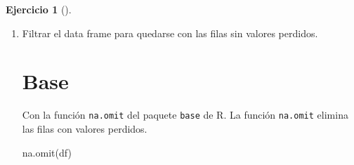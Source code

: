 \documentclass[
  spanish,
  a4paper,
]{scrreport}
\newenvironment{Shaded}{\begin{snugshade}}{\end{snugshade}}
\newcommand{\DecValTok}[1]{\textcolor[rgb]{0.68,0.00,0.00}{#1}}
\newcommand{\FunctionTok}[1]{\textcolor[rgb]{0.28,0.35,0.67}{#1}}
\newcommand{\NormalTok}[1]{\textcolor[rgb]{0.00,0.23,0.31}{#1}}
\newcommand{\SpecialCharTok}[1]{\textcolor[rgb]{0.37,0.37,0.37}{#1}}
\newcommand{\StringTok}[1]{\textcolor[rgb]{0.13,0.47,0.30}{#1}}
\theoremstyle{definition}
\newtheorem{exercise}{Ejercicio}[chapter]
\theoremstyle{remark}
\begin{document}
\begin{exercise}[]
\begin{enumerate}
\begin{tcolorbox}
\begin{Shaded}
\begin{Highlighting}[]
\NormalTok{df }\SpecialCharTok{|\textgreater{}} \FunctionTok{filter}\NormalTok{( sexo }\SpecialCharTok{==} \StringTok{"H"} \SpecialCharTok{\&}\NormalTok{ edad }\SpecialCharTok{\textgreater{}} \DecValTok{30}\NormalTok{)}
\end{Highlighting}
\end{Shaded}

\begin{verbatim}
# A tibble: 5 x 8
  nombre                      edad sexo   peso altura colesterol   imc Obesidad 
  <chr>                      <dbl> <chr> <dbl>  <dbl>      <dbl> <dbl> <fct>    
1 Antonio Ruiz Cruz             68 H        66   1.74        249    22 Saludable
2 Antonio Fernández Ocaña       51 H        62   1.72        276    21 Saludable
3 Pedro Gálvez Tenorio          35 H        90   1.94        241    24 Saludable
4 Santiago Reillo Manzano       46 H        75   1.85        280    22 Saludable
5 José María de la Guía Sanz    58 H        78   1.87        198    22 Saludable
\end{verbatim}

  \end{tcolorbox}
\item
  Filtrar el data frame para quedarse con las filas sin valores
  perdidos.

  \begin{tcolorbox}[enhanced jigsaw, titlerule=0mm, arc=.35mm, rightrule=.15mm, opacitybacktitle=0.6, leftrule=.75mm, colframe=quarto-callout-tip-color-frame, toptitle=1mm, breakable, colbacktitle=quarto-callout-tip-color!10!white, bottomrule=.15mm, colback=white, left=2mm, bottomtitle=1mm, opacityback=0, title=\textcolor{quarto-callout-tip-color}{\faLightbulb}\hspace{0.5em}{Solución}, toprule=.15mm, coltitle=black]

  \section{Base}

  Con la función \texttt{na.omit} del paquete \texttt{base} de R. La
  función \texttt{na.omit} elimina las filas con valores perdidos.

\begin{Shaded}
\begin{Highlighting}[]
\FunctionTok{na.omit}\NormalTok{(df)}
\end{Highlighting}
\end{Shaded}


\end{tcolorbox}
\end{enumerate}
\end{exercise}
\end{document}
